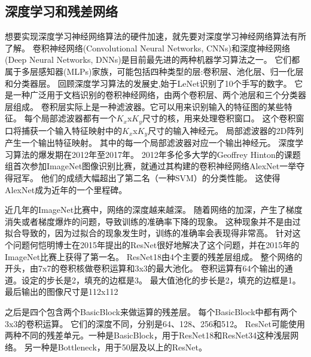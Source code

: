 \subsection{深度学习和残差网络}
想要实现深度学习神经网络算法的硬件加速，就先要对深度学习神经网络算法有所了解。
卷积神经网络(Convolutional Neural Networks, CNNs)\parencite{cnn1998}和深度神经网络(Deep Neural Networks, DNNs)\cite{dl2015}是目前最先进的两种机器学习算法之一。
它们都属于多层感知器(MLPs)家族，可能包括四种类型的层:卷积层、池化层、归一化层和分类器层\parencite{NN1998}。%
回顾深度学习算法的发展史,始于LeNet识别了10个手写的数字。
它是一种广泛用于文档识别的卷积神经网络，由两个卷积层、两个池层和三个分类器层组成。
卷积层实际上是一种滤波器。它可以用来识别输入的特征图的某些特征。
每个局部滤波器都有一个$K_x$x$K_y$尺寸的核，用来处理卷积窗口。
这个卷积窗口将捕获一个输入特征映射中的$K_x$x$K_y$尺寸的输入神经元。
局部滤波器的2D阵列产生一个输出特征映射。
其中的每一个局部滤波器对应一个输出神经元。
深度学习算法的爆发期在2012年至2017年。
2012年多伦多大学的Geoffrey Hinton的课题组首次参加ImageNet图像识别比赛，就通过其构建的卷积神经网络AlexNet\cite{alexnet2012}一举夺得冠军。
他们的成绩大幅超出了第二名（一种SVM）的分类性能。
这使得AlexNet成为近年的一个里程碑。


近几年的ImageNet比赛中，网络的深度越来越深。
随着网络的加深，产生了梯度消失或者梯度爆炸的问题，导致训练的准确率下降的现象。
这种现象并不是由过拟合导致的，因为过拟合的现象发生时，训练的准确率会表现得非常高。
针对这个问题何恺明博士在2015年提出的ResNet很好地解决了这个问题，并在2015年的ImageNet比赛上获得了第一名\parencite{resnet2015}。
ResNet18由4个主要的残差层组成。
整个网络的开头，由7x7的卷积核做卷积运算和3x3的最大池化。
卷积运算有64个输出的通道。设定的步长是2，填充的边框是3。
最大值池化的步长是2，填充的边框是1。
最后输出的图像尺寸是112x112

之后是四个包含两个BasicBlock来做运算的残差层。
每个BasicBlock中都有两个3x3的卷积运算。
它们的深度不同，分别是64、128、256和512。
ResNet可能使用两种不同的残差单元。一种是BasicBlock，用于ResNet18和ResNet34这种浅层网络。
另一种是Bottleneck，用于50层及以上的ResNet。

